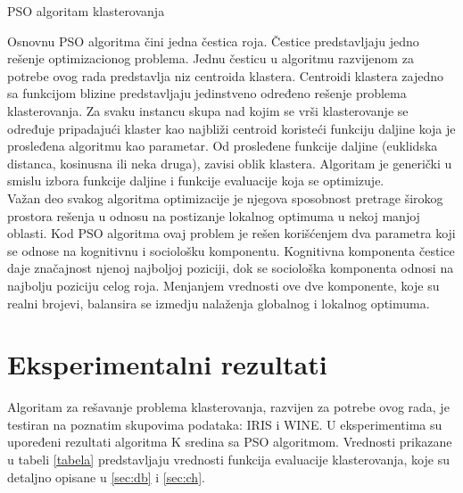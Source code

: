 \documentclass[a4paper, twocolumn]{article}
\begin{document}
{\begin{algorithm}
 \caption{PSO algoritam klasterovanja}
 \label{pseudokod}
\end{algorithm}

Osnovnu PSO algoritma čini jedna čestica roja. Čestice predstavljaju jedno rešenje optimizacionog problema.
Jednu česticu u algoritmu razvijenom za potrebe ovog rada predstavlja niz centroida klastera.
Centroidi klastera zajedno sa funkcijom blizine predstavljaju jedinstveno određeno rešenje problema klasterovanja. Za svaku instancu skupa nad kojim se vrši klasterovanje se određuje pripadajući klaster kao najbliži centroid koristeći funkciju daljine koja je prosleđena algoritmu kao parametar.
Od prosleđene funkcije daljine (euklidska distanca, kosinusna ili neka druga), zavisi oblik klastera.
Algoritam je generički u smislu izbora funkcije daljine i funkcije evaluacije koja se optimizuje.\\

Važan deo svakog algoritma optimizacije je njegova sposobnost pretrage širokog prostora rešenja u odnosu na postizanje lokalnog optimuma u nekoj manjoj oblasti. Kod PSO algoritma ovaj problem je rešen korišćenjem dva parametra koji se odnose na kognitivnu i sociološku komponentu.
Kognitivna komponenta čestice daje značajnost njenoj najboljoj poziciji, dok se sociološka komponenta odnosi na najbolju poziciju celog roja.
Menjanjem vrednosti ove dve komponente, koje su realni brojevi, balansira se izmedju nalaženja globalnog i lokalnog optimuma.\\

\section{Eksperimentalni rezultati}
Algoritam za rešavanje problema klasterovanja, razvijen za potrebe ovog rada, je testiran na poznatim skupovima podataka: IRIS i WINE. U eksperimentima su upoređeni rezultati algoritma K sredina sa PSO algoritmom. Vrednosti prikazane u tabeli \ref{tabela} predstavljaju vrednosti funkcija evaluacije klasterovanja, koje su detaljno opisane u \ref{sec:db} i \ref{sec:ch}.\\

}
\end{document}
